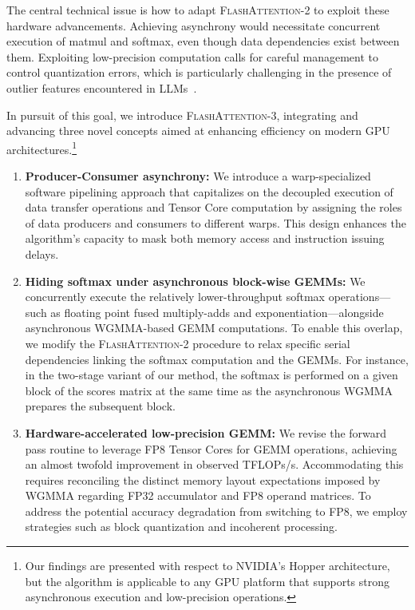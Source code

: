 The central technical issue is how to adapt \textsc{FlashAttention-2} to exploit these hardware advancements. Achieving asynchrony would necessitate concurrent execution of matmul and softmax, even though data dependencies exist between them. Exploiting low-precision computation calls for careful management to control quantization errors, which is particularly challenging in the presence of outlier features encountered in LLMs~\citep{dettmers2208llm, sun2024massive}.

In pursuit of this goal, we introduce \textsc{FlashAttention-3}, integrating and advancing three novel concepts aimed at enhancing efficiency on modern GPU architectures.\footnote{Our findings are presented with respect to NVIDIA's Hopper architecture, but the algorithm is applicable to any GPU platform that supports strong asynchronous execution and low-precision operations.}

\begin{enumerate}

\item \textbf{Producer-Consumer asynchrony:} We introduce a warp-specialized software pipelining approach that capitalizes on the decoupled execution of data transfer operations and Tensor Core computation by assigning the roles of data producers and consumers to different warps. This design enhances the algorithm’s capacity to mask both memory access and instruction issuing delays.
\item \textbf{Hiding softmax under asynchronous block-wise GEMMs:} We concurrently execute the relatively lower-throughput softmax operations—such as floating point fused multiply-adds and exponentiation—alongside asynchronous WGMMA-based GEMM computations. To enable this overlap, we modify the \textsc{FlashAttention-2} procedure to relax specific serial dependencies linking the softmax computation and the GEMMs. For instance, in the two-stage variant of our method, the softmax is performed on a given block of the scores matrix at the same time as the asynchronous WGMMA prepares the subsequent block.
\item \textbf{Hardware-accelerated low-precision GEMM:} We revise the forward pass routine to leverage FP8 Tensor Cores for GEMM operations, achieving an almost twofold improvement in observed TFLOPs/s. Accommodating this requires reconciling the distinct memory layout expectations imposed by WGMMA regarding FP32 accumulator and FP8 operand matrices. To address the potential accuracy degradation from switching to FP8, we employ strategies such as block quantization and incoherent processing.
\end{enumerate}

